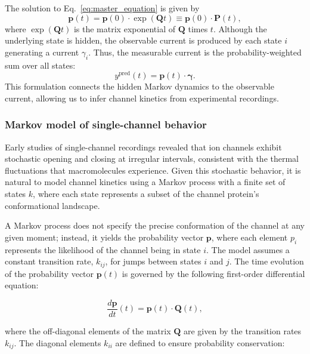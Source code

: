 \documentclass[pdflatex,sn-mathphys-num]{sn-jnl}%
\theoremstyle{thmstyleone}%
\theoremstyle{thmstyletwo}%
\theoremstyle{thmstylethree}%
\begin{document}
The solution to Eq.~\ref{eq:master_equation} is given by
\begin{equation}
	\boldsymbol{p}(t) = \boldsymbol{p}(0) \cdot \exp(\boldsymbol{Q}t) \equiv \boldsymbol{p}(0) \cdot \boldsymbol{P}(t),
	\label{eq:master_equation_solution}
\end{equation}
where \(\exp(\boldsymbol{Q}t)\) is the matrix exponential of \(\boldsymbol{Q}\) times \(t\). Although the underlying state is hidden, the observable current is produced by each state \(i\) generating a current \(\gamma_i\). Thus, the measurable current is the probability-weighted sum over all states:
\begin{equation}
	y^{\text{pred}}(t) = \boldsymbol{p}(t) \cdot \boldsymbol{\gamma}.
	\label{eq:single_channel_prediction}
\end{equation}
This formulation connects the hidden Markov dynamics to the observable current, allowing us to infer channel kinetics from experimental recordings.

\subsubsection{Markov model of single-channel behavior}


Early studies of single-channel recordings revealed that ion channels exhibit stochastic opening and closing at irregular intervals, consistent with the thermal fluctuations that macromolecules experience. Given this stochastic behavior, it is natural to model channel kinetics using a Markov process with a finite set of states \( k \), where each state represents a subset of the channel protein’s conformational landscape. 

A Markov process does not specify the precise conformation of the channel at any given moment; instead, it yields the probability vector \( \boldsymbol{p} \), where each element \( p_i \) represents the likelihood of the channel being in state \( i \). The model assumes a constant transition rate, \( k_{ij} \), for jumps between states \( i \) and \( j \). The time evolution of the probability vector \( \boldsymbol{p}(t) \) is governed by the following first-order differential equation:

\begin{equation}
	\frac{d \boldsymbol{p}}{dt}(t) = \boldsymbol{p}(t) \cdot \boldsymbol{Q}(t),
	\label{eq:master_equation}
\end{equation}

where the off-diagonal elements of the matrix \( \boldsymbol{Q} \) are given by the transition rates \( k_{ij} \). The diagonal elements \( k_{ii} \) are defined to ensure probability conservation:
\end{document}
